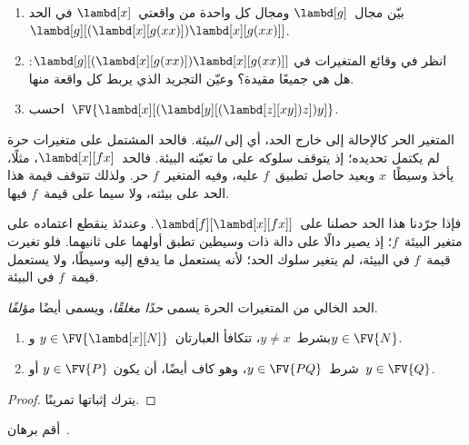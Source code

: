 \documentclass[../../../include/open-logic-section]{subfiles}
\begin{document}
\begin{prob}
  \begin{enumerate}
  \item بيّن مجال~$\lambd[g]$ ومجال كل واحدة من واقعتي~$\lambd[x]$ في الحد
    $\lambd[g][(\lambd[x][g (x x)]) \lambd[x][g (x x)]]$.
  \item انظر في وقائع المتغيرات في
    $\lambd[g][(\lambd[x][g (x x)]) \lambd[x][g (x x)]]$: هل هي جميعًا مقيدة؟ وعيّن التجريد الذي يربط كل واقعة منها.
    \item احسب~$\FV{\lambd[x][(\lambd[y][(\lambd[z][x y]) z]) y]}$.
  \end{enumerate}
\end{prob}

\begin{explain}
المتغير الحر كالإحالة إلى خارج الحد، أي إلى \emph{البيئة}.
فالحد المشتمل على متغيرات حرة لم يكتمل تحديده؛ إذ يتوقف سلوكه على ما تعيّنه البيئة.
فالحد~$\lambd[x][f x]$، مثلًا، يأخذ وسيطًا~$x$ ويعيد حاصل تطبيق~$f$ عليه،
وفيه المتغير~$f$ حر. ولذلك تتوقف قيمة هذا الحد على بيئته،
ولا سيما على قيمة~$f$ فيها.

فإذا جرّدنا هذا الحد حصلنا على~$\lambd[f][\lambd[x][f
    x]]$. وعندئذ ينقطع اعتماده على متغير البيئة~$f$؛
إذ يصير دالًا على دالة ذات وسيطين تطبق أولهما على ثانيهما.
فلو تغيرت قيمة~$f$ في البيئة، لم يتغير سلوك الحد؛
لأنه يستعمل ما يدفع إليه وسيطًا، ولا يستعمل قيمة~$f$ في البيئة.
\end{explain}

\begin{defn}
  الحد الخالي من المتغيرات الحرة يسمى \emph{حدًا مغلقًا}،
  ويسمى أيضًا \emph{مؤلفًا}.
\end{defn}

\begin{lem}
  \begin{enumerate}
    \item {} بشرط~$y \neq x$، تتكافأ العبارتان~$y \in
      \FV{\lambd[x][N]}$ و$y \in \FV{N}$.
    \item {} شرط~$y \in \FV{PQ}$، وهو كاف أيضًا، أن يكون
      $y \in \FV{P}$ أو~$y \in \FV{Q}$.
    \end{enumerate}
\end{lem}

\begin{proof}
  يترك إثباتها تمرينًا.
\end{proof}

\begin{prob}
  أقم برهان~.
\end{prob}
\end{document}
